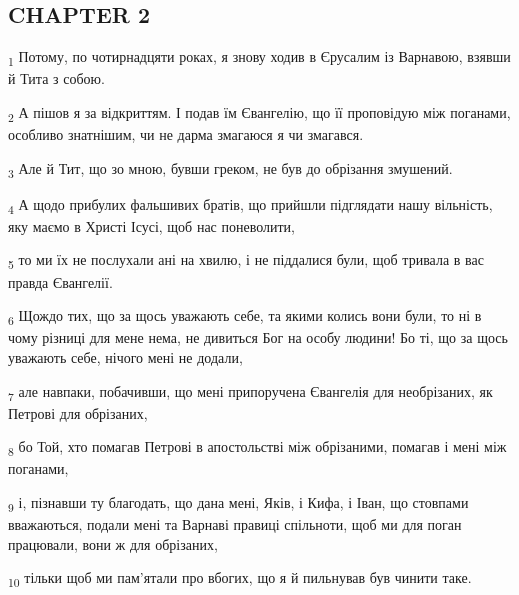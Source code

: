 \subsection{CHAPTER 2}
\begin{tcolorbox}
\textsubscript{1} Потому, по чотирнадцяти роках, я знову ходив в Єрусалим із Варнавою, взявши й Тита з собою.
\end{tcolorbox}
\begin{tcolorbox}
\textsubscript{2} А пішов я за відкриттям. І подав їм Євангелію, що її проповідую між поганами, особливо знатнішим, чи не дарма змагаюся я чи змагався.
\end{tcolorbox}
\begin{tcolorbox}
\textsubscript{3} Але й Тит, що зо мною, бувши греком, не був до обрізання змушений.
\end{tcolorbox}
\begin{tcolorbox}
\textsubscript{4} А щодо прибулих фальшивих братів, що прийшли підглядати нашу вільність, яку маємо в Христі Ісусі, щоб нас поневолити,
\end{tcolorbox}
\begin{tcolorbox}
\textsubscript{5} то ми їх не послухали ані на хвилю, і не піддалися були, щоб тривала в вас правда Євангелії.
\end{tcolorbox}
\begin{tcolorbox}
\textsubscript{6} Щождо тих, що за щось уважають себе, та якими колись вони були, то ні в чому різниці для мене нема, не дивиться Бог на особу людини! Бо ті, що за щось уважають себе, нічого мені не додали,
\end{tcolorbox}
\begin{tcolorbox}
\textsubscript{7} але навпаки, побачивши, що мені припоручена Євангелія для необрізаних, як Петрові для обрізаних,
\end{tcolorbox}
\begin{tcolorbox}
\textsubscript{8} бо Той, хто помагав Петрові в апостольстві між обрізаними, помагав і мені між поганами,
\end{tcolorbox}
\begin{tcolorbox}
\textsubscript{9} і, пізнавши ту благодать, що дана мені, Яків, і Кифа, і Іван, що стовпами вважаються, подали мені та Варнаві правиці спільноти, щоб ми для поган працювали, вони ж для обрізаних,
\end{tcolorbox}
\begin{tcolorbox}
\textsubscript{10} тільки щоб ми пам'ятали про вбогих, що я й пильнував був чинити таке.
\end{tcolorbox}
